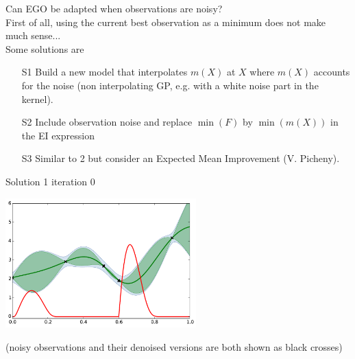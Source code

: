 
\begin{frame}{}
Can EGO be adapted when observations are noisy?\\
\vspace{5mm}
First of all, using the current best observation as a minimum does not make much sense...\\
\vspace{5mm}
Some solutions are
\begin{itemize}
	\item[S1] Build a new model that interpolates $m(X)$ at $X$ where $m(X)$ accounts for the noise (non interpolating GP, e.g. with a white noise part in the kernel).
	\item[S2] Include observation noise and replace $\min(F)$ by $\min(m(X))$ in the EI expression
	\item[S3] Similar to 2 but consider an Expected Mean Improvement (V. Picheny).
\end{itemize}
\end{frame}

\begin{frame}{Solution 1}
iteration 0
\begin{center}
\includegraphics[height=5cm]{4_optimization/figures/python/ego_EI1n0}
\end{center}
\tiny (noisy observations and their denoised versions are both shown as black crosses)\\
\end{frame}

